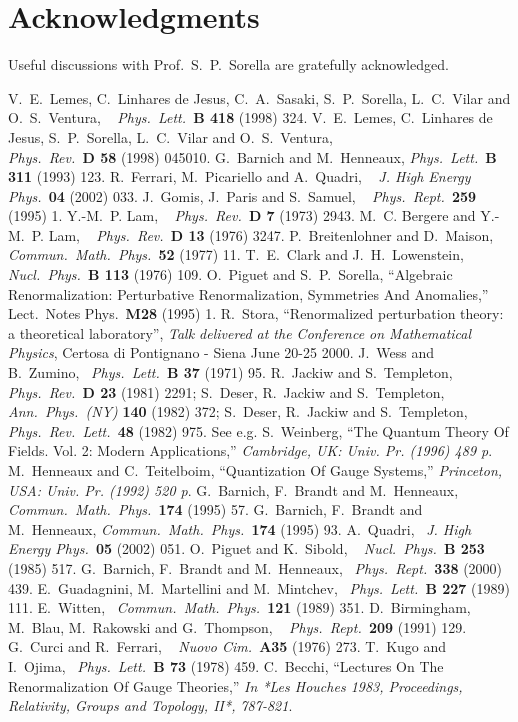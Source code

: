 \documentclass[a4paper,11pt]{article}
\newcommand\plb[3]{{\it Phys.\ Lett.\ }{\bf B #1} (#2) #3}
\newcommand\prd[3]{{\it Phys.\ Rev.\ }{\bf D #1} (#2) #3}
\newcommand\jhep[3]{{\it J. High Energy Phys.\ }{\bf #1} (#2) #3}
\newcommand\prep[3]{{\it Phys.\ Rept.\ }{\bf #1} (#2) #3}
\newcommand\cmp[3]{{\it Commun.\ Math.\ Phys.\ }{\bf #1} (#2) #3}
\newcommand\npb[3]{{\it Nucl.\ Phys.\ }{\bf B #1} (#2) #3}
\newcommand\ap[3]{{\it Ann.\ Phys.\ (NY) }{\bf #1} (#2) #3}
\newcommand\prl[3]{{\it Phys.\ Rev.\ Lett.\ }{\bf #1} (#2) #3}
\newcommand\nc[3]{{\it Nuovo Cim.\ }{\bf #1} (#2) #3}
\begin{document}
\section*{Acknowledgments}

Useful discussions with Prof.~S.~P.~Sorella are gratefully acknowledged.

\begin{thebibliography}{99}
%
V.~E.~Lemes, C.~Linhares de Jesus, C.~A.~Sasaki, S.~P.~Sorella, L.~C.~Vilar and O.~S.~Ventura, ~ \plb{418}{1998}{324}.
%
V.~E.~Lemes, C.~Linhares de Jesus, S.~P.~Sorella, L.~C.~Vilar and O.~S.~Ventura,\\ \prd{58}{1998}{045010}.
%
G.~Barnich and M.~Henneaux,
\plb{311}{1993}{123}.
%
R.~Ferrari, M.~Picariello and A.~Quadri, ~ \jhep{04}{2002}{033}.
%
J.~Gomis, J.~Paris and S.~Samuel, ~ \prep{259}{1995}{1}.
%
Y.-M.~P. Lam, ~ \prd{7}{1973}{2943}.
%
M.~C. Bergere and Y.-M.~P. Lam, ~ \prd{13}{1976}{3247}.
%
P.~Breitenlohner and D.~Maison, ~ \cmp{52}{1977}{11}.
%
T.~E.~Clark and J.~H.~Lowenstein, ~ \npb{113}{1976}{109}.
%
O.~Piguet and S.~P.~Sorella,
``Algebraic Renormalization: Perturbative Renormalization, Symmetries And Anomalies,''
Lect.\ Notes Phys.\  {\bf M28} (1995) 1.
%
{R.~Stora,
 ``Renormalized perturbation theory: a theoretical laboratory'',
 {\it Talk delivered at the Conference on Mathematical Physics},
 Certosa di Pontignano - Siena June 20-25 2000.}
%
J.~Wess and B.~Zumino,~ \plb{37}{1971}{95}.
%
R.~Jackiw and S.~Templeton, ~ \prd{23}{1981}{2291};
S.~Deser, R.~Jackiw and S.~Templeton,~ \ap{140}{1982}{372};
S.~Deser, R.~Jackiw and S.~Templeton, ~ \prl{48}{1982}{975}.
%
See e.g. S.~Weinberg,
``The Quantum Theory Of Fields. Vol. 2: Modern Applications,''
{\it  Cambridge, UK: Univ. Pr. (1996) 489 p}.
%
M.~Henneaux and C.~Teitelboim,
``Quantization Of Gauge Systems,''
{\it  Princeton, USA: Univ. Pr. (1992) 520 p}.
%
G.~Barnich, F.~Brandt and M.~Henneaux,
\cmp{174}{1995}{57}.
%
G.~Barnich, F.~Brandt and M.~Henneaux,
\cmp{174}{1995}{93}.
%
A.~Quadri,~ \jhep{05}{2002}{051}.
%
O.~Piguet and K.~Sibold, ~ \npb{253}{1985}{517}.
%
G.~Barnich, F.~Brandt and M.~Henneaux,~ \prep{338}{2000}{439}.
%
E.~Guadagnini, M.~Martellini and M.~Mintchev,~ \plb{227}{1989}{111}.
%
E.~Witten,~ \cmp{121}{1989}{351}.
%
D.~Birmingham, M.~Blau, M.~Rakowski and G.~Thompson,
~ \prep{209}{1991}{129}.
%
G.~Curci and R.~Ferrari,
~ \nc{A35}{1976}{273}.
%
T.~Kugo and I.~Ojima,~ \plb{73}{1978}{459}.
%
C.~Becchi,
``Lectures On The Renormalization Of Gauge Theories,''
{\it  In *Les Houches 1983, Proceedings, Relativity, Groups and Topology, II*, 787-821}.
%
%

\end{thebibliography}
\end{document}
